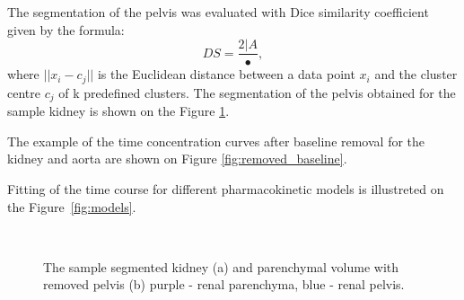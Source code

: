 The segmentation of the pelvis was evaluated with Dice similarity coefficient given by the formula:
\begin{equation}
	\label{eq:dice}
	DS = \dfrac{2|A}{•},
\end{equation}
where $||x_i-c_j||$ is  the Euclidean distance between a data point $x_i$ and the cluster centre $c_j$ of k predefined clusters. 
The segmentation of the pelvis obtained for the sample kidney is shown on the Figure \ref{fig:kidney_segmented}. 

The example of the time concentration curves after baseline removal for the kidney and aorta are shown on Figure \ref{fig:removed_baseline}. 

Fitting of the time course for different pharmacokinetic models  is illustreted on the Figure~\ref{fig:models}.



\begin{figure}[h!]
	\centering
	\quad
	\\	
	\caption{The sample segmented kidney (a) and parenchymal volume with removed pelvis (b) purple - renal parenchyma, blue - renal pelvis.}
\label{fig:kidney_segmented}
\end{figure}



